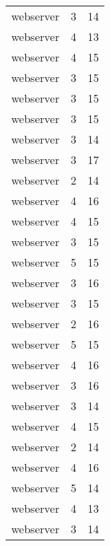 \begin{table}
\begin{tabular}{lrr}
                       webserver &         3 &        14 \\
                       webserver &         4 &        13 \\
                       webserver &         4 &        15 \\
                       webserver &         3 &        15 \\
                       webserver &         3 &        15 \\
                       webserver &         3 &        15 \\
                       webserver &         3 &        14 \\
                       webserver &         3 &        17 \\
                       webserver &         2 &        14 \\
                       webserver &         4 &        16 \\
                       webserver &         4 &        15 \\
                       webserver &         3 &        15 \\
                       webserver &         5 &        15 \\
                       webserver &         3 &        16 \\
                       webserver &         3 &        15 \\
                       webserver &         2 &        16 \\
                       webserver &         5 &        15 \\
                       webserver &         4 &        16 \\
                       webserver &         3 &        16 \\
                       webserver &         3 &        14 \\
                       webserver &         4 &        15 \\
                       webserver &         2 &        14 \\
                       webserver &         4 &        16 \\
                       webserver &         5 &        14 \\
                       webserver &         4 &        13 \\
                       webserver &         3 &        14 \\

\end{tabular}
\end{table}
